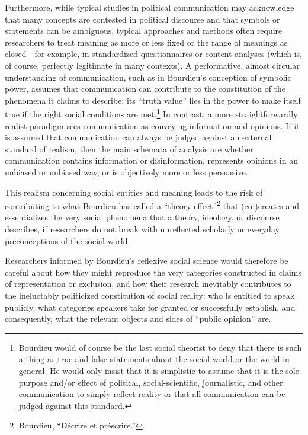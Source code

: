 \documentclass{tufte-handout}
\begin{document}
Furthermore, while typical studies in political communication may
acknowledge that many concepts are contested in political discourse and
that symbols or statements can be ambiguous, typical approaches and
methods often require researchers to treat meaning as more or less fixed
or the range of meanings as closed---for example, in standardized
questionnaires or content analyses (which is, of course, perfectly
legitimate in many contexts). A performative, almost circular
understanding of communication, such as in Bourdieu's conception of
symbolic power, assumes that communication can contribute to the
constitution of the phenomena it claims to describe; its ``truth value''
lies in the power to make itself true if the right social conditions are
met.\footnote{Bourdieu would of course be the last social theorist to
  deny that there is such a thing as true and false statements about the
  social world or the world in general. He would only insist that it is
  simplistic to assume that it is the sole purpose and/or effect of
  political, social-scientific, journalistic, and other communication to
  simply reflect reality or that all communication can be judged against
  this standard.} In contrast, a more straightforwardly realist paradigm
sees communication as conveying information and opinions. If it is
assumed that communication can always be judged against an external
standard of realism, then the main schemata of analysis are whether
communication contains information or disinformation, represents
opinions in an unbiased or unbiased way, or is objectively more or less
persuasive.

This realism concerning social entities and meaning leads to the risk of
contributing to what Bourdieu has called a ``theory effect''\footnote{Bourdieu,
  ``Décrire et préscrire.''} that (co-)creates and essentializes the
very social phenomena that a theory, ideology, or discourse describes,
if researchers do not break with unreflected scholarly or everyday
preconceptions of the social world.

Researchers informed by Bourdieu's reflexive social science would
therefore be careful about how they might reproduce the very categories
constructed in claims of representation or exclusion, and how their
research inevitably contributes to the ineluctably politicized
constitution of social reality: who is entitled to speak publicly, what
categories speakers take for granted or successfully establish, and
consequently, what the relevant objects and sides of ``public opinion''
are.
\end{document}
